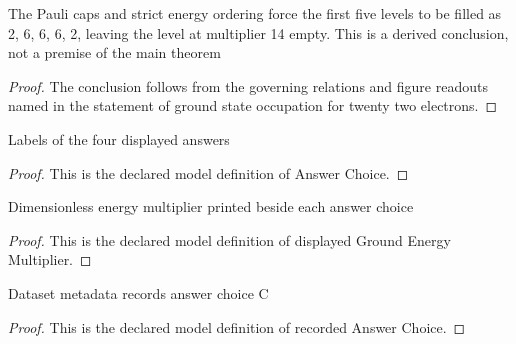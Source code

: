 \begin{lemma}
  \label{lem:physics:phyx-mini-0580:phyxminiproblems-problemphyxmini0580-ground-state-occupation-for-twenty-two-electrons}
  The Pauli caps and strict energy ordering force the first five levels to be filled as 2, 6, 6, 6, 2, leaving the level at multiplier 14 empty. This is a derived conclusion, not a premise of the main theorem
\end{lemma}
\begin{proof}
  The conclusion follows from the governing relations and figure readouts named in the statement of ground state occupation for twenty two electrons.
\end{proof}
\begin{definition}
  \label{def:physics:phyx-mini-0580:phyxminiproblems-problemphyxmini0580-answerchoice}
  Labels of the four displayed answers
\end{definition}
\begin{proof}
  This is the declared model definition of Answer Choice.
\end{proof}
\begin{definition}
  \label{def:physics:phyx-mini-0580:phyxminiproblems-problemphyxmini0580-displayedgroundenergymultiplier}
  Dimensionless energy multiplier printed beside each answer choice
\end{definition}
\begin{proof}
  This is the declared model definition of displayed Ground Energy Multiplier.
\end{proof}
\begin{definition}
  \label{def:physics:phyx-mini-0580:phyxminiproblems-problemphyxmini0580-recordedanswerchoice}
  Dataset metadata records answer choice C
\end{definition}
\begin{proof}
  This is the declared model definition of recorded Answer Choice.
\end{proof}
